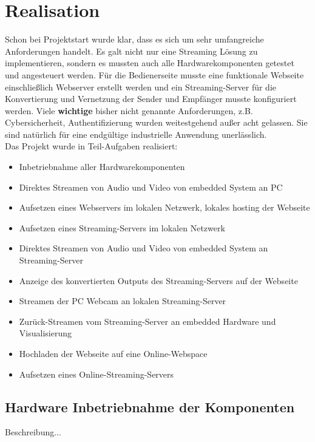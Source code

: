 \section{Realisation}
Schon bei Projektstart wurde klar, dass es sich um sehr umfangreiche Anforderungen handelt. Es galt nicht nur eine Streaming Lösung zu implementieren, sondern es mussten auch alle Hardwarekomponenten getestet und angesteuert werden. Für die Bedienerseite musste eine funktionale Webseite einschließlich Webserver erstellt werden und ein Streaming-Server für die Konvertierung und Vernetzung der Sender und Empfänger musste konfiguriert werden. Viele \textbf{wichtige} bisher nicht genannte Anforderungen, z.B. Cybersicherheit, Authentifizierung wurden weitestgehend außer acht gelassen. Sie sind natürlich für eine endgültige industrielle Anwendung unerlässlich.\\

Das Projekt wurde in Teil-Aufgaben realisiert:
\begin{itemize}
\item Inbetriebnahme aller Hardwarekomponenten

\item Direktes Streamen von Audio und Video von embedded System an PC
\item Aufsetzen eines Webservers im lokalen Netzwerk, lokales hosting der Webseite
\item Aufsetzen eines Streaming-Servers im lokalen Netzwerk
\item Direktes Streamen von Audio und Video von embedded System an Streaming-Server
\item Anzeige des konvertierten Outputs des Streaming-Servers auf der Webseite

\item Streamen der PC Webcam an lokalen Streaming-Server
\item Zurück-Streamen vom Streaming-Server an embedded Hardware und Visualisierung

\item Hochladen der Webseite auf eine Online-Webspace
\item Aufsetzen eines Online-Streaming-Servers
\end{itemize}

\subsection{Hardware Inbetriebnahme der Komponenten}
Beschreibung...\\

